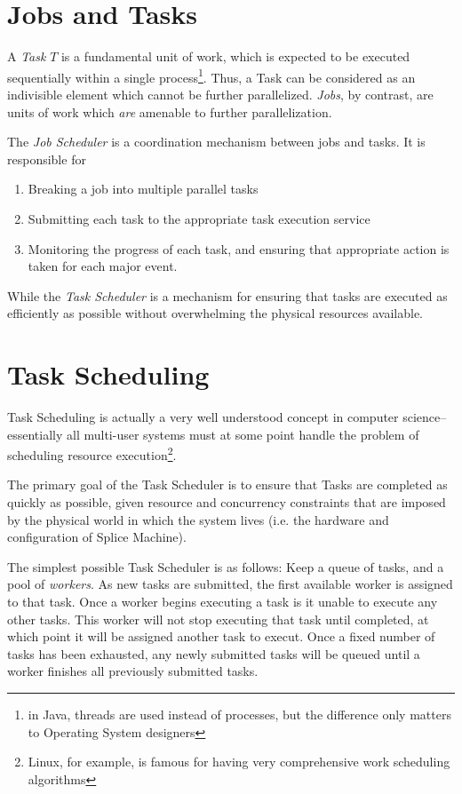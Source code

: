 \section{Jobs and Tasks}
A \emph{Task} $T$ is a fundamental unit of work, which is expected to be executed sequentially within a single process\footnote{in Java, threads are used instead of processes, but the difference only matters to Operating System designers}. Thus, a Task can be considered as an indivisible element which cannot be further parallelized. \emph{Jobs}, by contrast, are units of work which \emph{are} amenable to further parallelization. 

The \emph{Job Scheduler} is a coordination mechanism between jobs and tasks. It is responsible for
\begin{enumerate}
\item Breaking a job into multiple parallel tasks
\item Submitting each task to the appropriate task execution service
\item Monitoring the progress of each task, and ensuring that appropriate action is taken for each major event.
\end{enumerate}

While the \emph{Task Scheduler} is a mechanism for ensuring that tasks are executed as efficiently as possible without overwhelming the physical resources available.

\section{Task Scheduling}
Task Scheduling is actually a very well understood concept in computer science--essentially all multi-user systems must at some point handle the problem of scheduling resource execution\footnote{Linux, for example, is famous for having very comprehensive work scheduling algorithms}.

The primary goal of the Task Scheduler is to ensure that Tasks are completed as quickly as possible, given resource and concurrency constraints that are imposed by the physical world in which the system lives (i.e. the hardware and configuration of Splice Machine).

The simplest possible Task Scheduler is as follows: Keep a queue of tasks, and a pool of \emph{workers}. As new tasks are submitted, the first available worker is assigned to that task. Once a worker begins executing a task is it unable to execute any other tasks. This worker will not stop executing that task until completed, at which point it will be assigned another task to execut. Once a fixed number of tasks has been exhausted, any newly submitted tasks will be queued until a worker finishes all previously submitted tasks.

